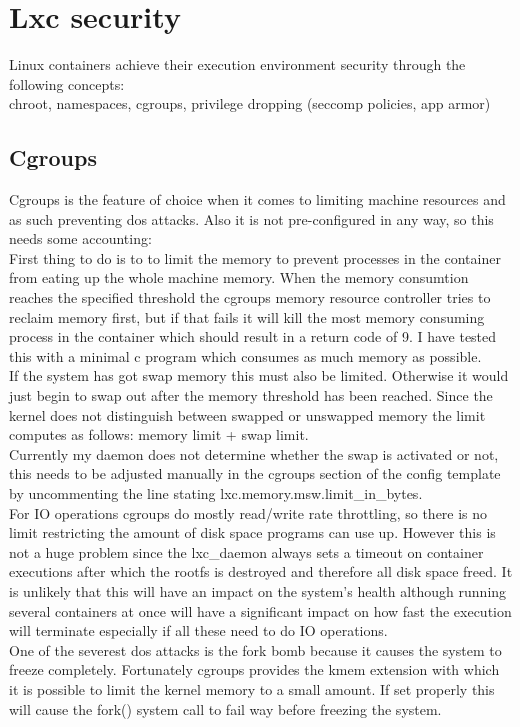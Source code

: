 \chapter{Lxc security}

Linux containers achieve their execution environment security through the following concepts:\\
chroot, namespaces, cgroups, privilege dropping (seccomp policies, app armor)\\

\section{Cgroups}

Cgroups is the feature of choice when it comes to limiting machine resources and as such preventing dos attacks.
Also it is not pre-configured in any way, so this needs some accounting:\\
First thing to do is to to limit the memory to prevent processes in the container from eating up the whole machine memory.
When the memory consumtion reaches the specified threshold the cgroups memory resource controller tries to reclaim memory first,
but if that fails it will kill the most memory consuming process in the container which should result in a return code of 9.
I have tested this with a minimal c program which consumes as much memory as possible.\\
If the system has got swap memory this must also be limited. Otherwise it would just begin to swap out after the memory
threshold has been reached. Since the kernel does not distinguish between swapped or unswapped memory the limit computes as follows:
memory limit + swap limit.\\
Currently my daemon does not determine whether the swap is activated or not, this needs to be adjusted manually in the cgroups
section of the config template by uncommenting the line stating lxc.memory.msw.limit\_in\_bytes.\\
For IO operations cgroups do mostly read/write rate throttling, so there is no limit restricting the amount of disk space programs
can use up. However this is not a huge problem since the lxc\_daemon always sets a timeout on container executions after which the
rootfs is destroyed and therefore all disk space freed. It is unlikely that this will have an impact on the system's health although
running several containers at once will have a significant impact on how fast the execution will terminate especially if all these
need to do IO operations.\\
One of the severest dos attacks is the fork bomb because it causes the system to freeze completely. Fortunately cgroups provides
the kmem extension with which it is possible to limit the kernel memory to a small amount. If set properly this will cause the fork()
system call to fail way before freezing the system.

